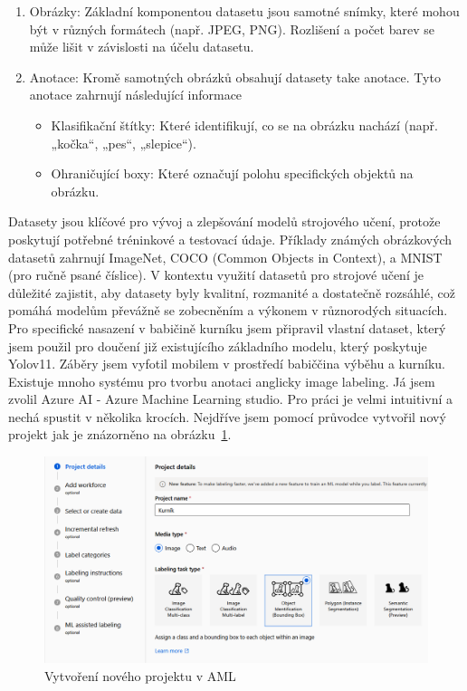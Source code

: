 \begin{enumerate}
    \item Obrázky: Základní komponentou datasetu jsou samotné snímky, které mohou být v různých formátech (např. JPEG, PNG). Rozlišení a počet barev se může lišit v závislosti na účelu datasetu.
    \item Anotace: Kromě samotných obrázků obsahují datasety take anotace. Tyto anotace zahrnují následující informace
    \begin{itemize}
        \item Klasifikační štítky: Které identifikují, co se na obrázku nachází (např. „kočka“, „pes“, „slepice“).
        \item Ohraničující boxy: Které označují polohu specifických objektů na obrázku.
    \end{itemize}
\end{enumerate}

Datasety jsou klíčové pro vývoj a zlepšování modelů strojového učení, protože poskytují potřebné tréninkové a testovací údaje.
Příklady známých obrázkových datasetů zahrnují ImageNet, COCO (Common Objects in Context), a MNIST (pro ručně psané číslice).
V kontextu využití datasetů pro strojové učení je důležité zajistit, aby datasety byly kvalitní, rozmanité a dostatečně rozsáhlé, což pomáhá modelům převážně se zobecněním a výkonem v různorodých situacích.
Pro specifické nasazení v babičině kurníku jsem připravil vlastní dataset, který jsem použil pro doučení již existujícího základního modelu, který poskytuje Yolov11.
Záběry jsem vyfotil mobilem v prostředí babiččina výběhu a kurníku.
Existuje mnoho systému pro tvorbu anotaci anglicky image labeling.
Já jsem zvolil Azure AI - Azure Machine Learning studio.
Pro práci je velmi intuitivní a nechá spustit v několika krocích.
Nejdříve jsem pomocí průvodce vytvořil nový projekt jak je znázorněno na obrázku~\ref{fig:create_learning_project}.

\begin{figure}[h]
    \centering
    \includegraphics[width=\textwidth]{img/create_learning_project}
    \caption{Vytvoření nového projektu v AML}
    \label{fig:create_learning_project}
\end{figure}


